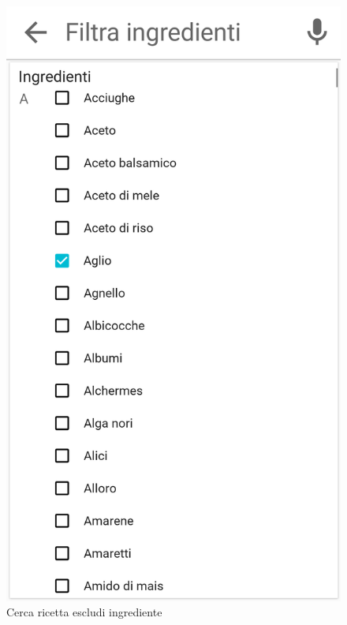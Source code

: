 \begin{figure}[H]
\begin{minipage}{.49\textwidth}
		\includegraphics[width=\textwidth]{img/wireframe/search_page_esclusione.png}
		\caption{Cerca ricetta escludi ingrediente}
		\label{fig:cerca_ricetta_escludi_ingrediente}
	\end{minipage}
\end{figure}	
